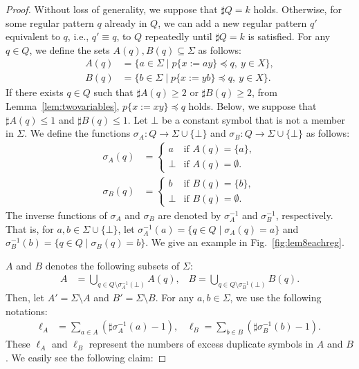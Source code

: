 \begin{proof}
Without loss of generality, we suppose that $\sharp Q = k$ holds. Otherwise, for some regular pattern $q$ already in $Q$, we can add a new regular pattern $q'$ equivalent to $q$, i.e., $q' \equiv q$, to $Q$ repeatedly until $\sharp Q = k$ is satisfied.
For any $q \in Q$, we define the sets $A(q), B(q) \subseteq \Sigma$ as follows:
\begin{align*}
  A(q) & = \{ a \in \Sigma \mid p \{ x:=ay \} \preceq q,\ y\in X\},\\ 
  B(q) & = \{ b \in \Sigma \mid p \{ x:=yb \} \preceq q,\ y\in X\}.
  \end{align*}
If there exists $q\in Q$ such that $\sharp A(q)\geq 2$ or $\sharp B(q)\geq 2$, from Lemma~\ref{lem:twovariables}, $p\{x := xy\} \preceq q$ holds.
Below, we suppose that $\sharp A(q)\leq 1$ and $\sharp B(q)\leq 1$.
Let $\bot$ be a constant symbol that is not a member in $\Sigma$.
We define the functions $\sigma_{A}: Q \rightarrow \Sigma \cup \{\bot\}$ and $\sigma_{B}: Q \rightarrow \Sigma \cup \{\bot\}$ as follows:
\begin{align*}
  \sigma_{A}(q) & =
  \begin{cases}
    a & \textrm{if } A(q) = \{a\}, \\
    \bot & \textrm{if } A(q) = \emptyset.
  \end{cases}\\
  \sigma_{B}(q) & =
  \begin{cases}
    b & \textrm{if } B(q) = \{b\}, \\
    \bot & \textrm{if } B(q) = \emptyset.
  \end{cases}
\end{align*}
The inverse functions of $\sigma_{A}$ and $\sigma_{B}$ are denoted by $\sigma_{A}^{-1}$ and $\sigma_{B}^{-1}$, respectively. That is, for $a,b \in \Sigma \cup \{\bot\}$, let $\sigma_{A}^{-1}(a) = \{q \in Q \mid \sigma_{A}(q) = a\}$ and $\sigma_{B}^{-1}(b) = \{q \in Q \mid \sigma_{B}(q) = b\}$. 
We give an example in Fig.~\ref{fig:lem8eachreg}.

$A$ and $B$ denotes the following subsets of $\Sigma$:
\begin{align*}
  A & = \bigcup_{q \in Q \setminus \sigma_{A}^{-1}(\bot)} A(q) \mbox{,~~~}
  B = \bigcup_{q \in Q \setminus \sigma_{B}^{-1}(\bot)} B(q).
\end{align*}
Then, let $A' = \Sigma \setminus A$ and $B' = \Sigma \setminus B$.
For any $a,b \in \Sigma$, we use the following notations:
\begin{align*}
  \ell_{A} &= \sum_{a \in A}(\sharp \sigma_{A}^{-1}(a) - 1) \mbox{,~~~}
  \ell_{B} = \sum_{b \in B}(\sharp \sigma_{B}^{-1}(b) - 1).
\end{align*}
These $\ell_{A}$ and $\ell_{B}$ represent the numbers of excess duplicate symbols in $A$ and $B$.
We easily see the following claim:  


\end{proof}
